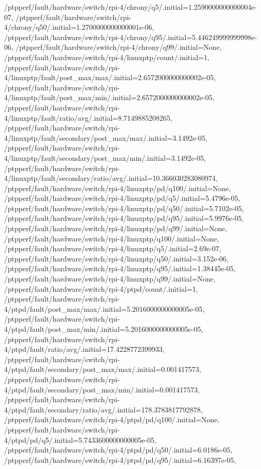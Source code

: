 {    /ptpperf/fault/hardware/switch/rpi-4/chrony/q5/.initial=1.2590000000000004e-07,
    /ptpperf/fault/hardware/switch/rpi-4/chrony/q50/.initial=1.2700000000000001e-06,
    /ptpperf/fault/hardware/switch/rpi-4/chrony/q95/.initial=5.446249999999998e-06,
    /ptpperf/fault/hardware/switch/rpi-4/chrony/q99/.initial=None,
    /ptpperf/fault/hardware/switch/rpi-4/linuxptp/count/.initial=1,
    /ptpperf/fault/hardware/switch/rpi-4/linuxptp/fault/post_max/max/.initial=2.6572000000000002e-05,
    /ptpperf/fault/hardware/switch/rpi-4/linuxptp/fault/post_max/min/.initial=2.6572000000000002e-05,
    /ptpperf/fault/hardware/switch/rpi-4/linuxptp/fault/ratio/avg/.initial=8.7149885208265,
    /ptpperf/fault/hardware/switch/rpi-4/linuxptp/fault/secondary/post_max/max/.initial=3.1492e-05,
    /ptpperf/fault/hardware/switch/rpi-4/linuxptp/fault/secondary/post_max/min/.initial=3.1492e-05,
    /ptpperf/fault/hardware/switch/rpi-4/linuxptp/fault/secondary/ratio/avg/.initial=10.366030283080974,
    /ptpperf/fault/hardware/switch/rpi-4/linuxptp/pd/q100/.initial=None,
    /ptpperf/fault/hardware/switch/rpi-4/linuxptp/pd/q5/.initial=5.4796e-05,
    /ptpperf/fault/hardware/switch/rpi-4/linuxptp/pd/q50/.initial=5.7102e-05,
    /ptpperf/fault/hardware/switch/rpi-4/linuxptp/pd/q95/.initial=5.9976e-05,
    /ptpperf/fault/hardware/switch/rpi-4/linuxptp/pd/q99/.initial=None,
    /ptpperf/fault/hardware/switch/rpi-4/linuxptp/q100/.initial=None,
    /ptpperf/fault/hardware/switch/rpi-4/linuxptp/q5/.initial=2.69e-07,
    /ptpperf/fault/hardware/switch/rpi-4/linuxptp/q50/.initial=3.152e-06,
    /ptpperf/fault/hardware/switch/rpi-4/linuxptp/q95/.initial=1.38445e-05,
    /ptpperf/fault/hardware/switch/rpi-4/linuxptp/q99/.initial=None,
    /ptpperf/fault/hardware/switch/rpi-4/ptpd/count/.initial=1,
    /ptpperf/fault/hardware/switch/rpi-4/ptpd/fault/post_max/max/.initial=5.2016000000000005e-05,
    /ptpperf/fault/hardware/switch/rpi-4/ptpd/fault/post_max/min/.initial=5.2016000000000005e-05,
    /ptpperf/fault/hardware/switch/rpi-4/ptpd/fault/ratio/avg/.initial=17.4228772399933,
    /ptpperf/fault/hardware/switch/rpi-4/ptpd/fault/secondary/post_max/max/.initial=0.001417573,
    /ptpperf/fault/hardware/switch/rpi-4/ptpd/fault/secondary/post_max/min/.initial=0.001417573,
    /ptpperf/fault/hardware/switch/rpi-4/ptpd/fault/secondary/ratio/avg/.initial=178.3783817792878,
    /ptpperf/fault/hardware/switch/rpi-4/ptpd/pd/q100/.initial=None,
    /ptpperf/fault/hardware/switch/rpi-4/ptpd/pd/q5/.initial=5.7433600000000005e-05,
    /ptpperf/fault/hardware/switch/rpi-4/ptpd/pd/q50/.initial=6.0186e-05,
    /ptpperf/fault/hardware/switch/rpi-4/ptpd/pd/q95/.initial=6.16397e-05,
}
